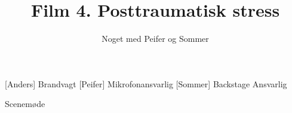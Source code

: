 \documentclass[a4paper,11pt]{article}
\title{Film 4. Posttraumatisk stress}
\author{Noget med Peifer og Sommer }
\begin{document}
\maketitle

\begin{roles}
[Anders] Brandvagt
[Peifer] Mikrofonansvarlig
[Sommer] Backstage Ansvarlig
\end{roles}

\begin{song}
Scenemøde
\end{song}
\end{document}
